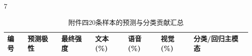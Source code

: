 \begin{PaperTable}{7}

\begin{table}[!htbp]
\centering\caption{附件四20条样本的预测与分类贡献汇总\label{q3-tab15}}
\begin{tabular}{@{}lllllll@{}}
\toprule
\begin{minipage}[b]{\dimexpr 0.080000\linewidth-0.960000\tabcolsep\relax}\raggedleft
编号\strut
\end{minipage} & \begin{minipage}[b]{\dimexpr 0.130000\linewidth-1.560000\tabcolsep\relax}\raggedright
预测极性\strut
\end{minipage} & \begin{minipage}[b]{\dimexpr 0.180000\linewidth-2.160000\tabcolsep\relax}\raggedleft
最终强度\strut
\end{minipage} & \begin{minipage}[b]{\dimexpr 0.140000\linewidth-1.680000\tabcolsep\relax}\raggedleft
文本(\%)\strut
\end{minipage} & \begin{minipage}[b]{\dimexpr 0.140000\linewidth-1.680000\tabcolsep\relax}\raggedleft
语音(\%)\strut
\end{minipage} & \begin{minipage}[b]{\dimexpr 0.140000\linewidth-1.680000\tabcolsep\relax}\raggedleft
视觉(\%)\strut
\end{minipage} & \begin{minipage}[b]{\dimexpr 0.190000\linewidth-2.280000\tabcolsep\relax}\raggedright
分类/回归主模态\strut
\end{minipage}\tabularnewline
\midrule


\end{tabular}
\end{table}
\end{PaperTable}
